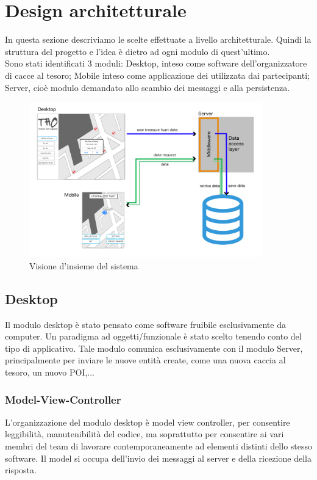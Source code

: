 \documentclass[12pt, italian]{article}
\begin{document}
\section{Design architetturale}
In questa sezione descriviamo le scelte effettuate a livello architetturale. Quindi la struttura del progetto e l'idea è dietro ad ogni modulo di quest'ultimo.\\
Sono stati identificati 3 moduli: Desktop, inteso come software dell'organizzatore di cacce al tesoro; Mobile inteso come applicazione dei utilizzata dai partecipanti; Server, cioè modulo demandato allo scambio dei messaggi e alla persistenza.

\begin{figure}[H]
	\centering
	\includegraphics[width=0.9\textwidth]{img/architetturale01.png}
	\caption{Visione d'insieme del sistema}
\end{figure}

\subsection{Desktop}
Il modulo desktop è stato pensato come software fruibile esclusivamente da computer. Un paradigma ad oggetti/funzionale è stato scelto tenendo conto del tipo di applicativo. Tale modulo  comunica esclusivamente con il modulo Server, principalmente per inviare le nuove entità create, come una nuova caccia al tesoro, un nuovo POI,...
\subsubsection{Model-View-Controller}
L'organizzazione del modulo desktop è model view controller, per consentire leggibilità, manutenibilità del codice, ma soprattutto per consentire ai vari membri del team di lavorare contemporaneamente ad elementi distinti dello stesso software.
Il model si occupa dell'invio dei messaggi al server e della ricezione della risposta.
\end{document}
